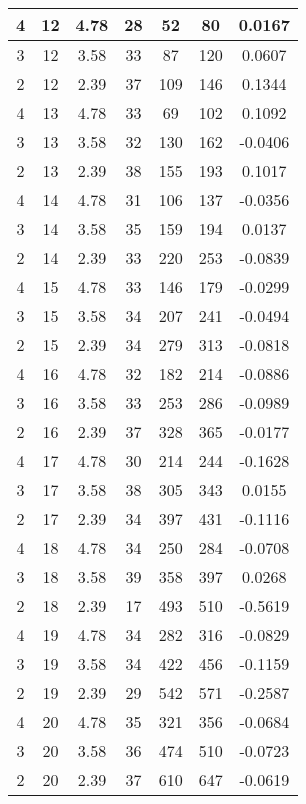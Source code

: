 \documentclass[letterpaper, 12pt]{article}
\begin{document}
\begin{longtable}{|c|c|c|c|c|c|c|}
\hline
4 & 12 & 4.78 & 28 & 52 & 80 & 0.0167 \\
\hline
3 & 12 & 3.58 & 33 & 87 & 120 & 0.0607 \\
\hline
2 & 12 & 2.39 & 37 & 109 & 146 & 0.1344 \\
\hline
4 & 13 & 4.78 & 33 & 69 & 102 & 0.1092 \\
\hline
3 & 13 & 3.58 & 32 & 130 & 162 & -0.0406 \\
\hline
2 & 13 & 2.39 & 38 & 155 & 193 & 0.1017 \\
\hline
4 & 14 & 4.78 & 31 & 106 & 137 & -0.0356 \\
\hline
3 & 14 & 3.58 & 35 & 159 & 194 & 0.0137 \\
\hline
2 & 14 & 2.39 & 33 & 220 & 253 & -0.0839 \\
\hline
4 & 15 & 4.78 & 33 & 146 & 179 & -0.0299 \\
\hline
3 & 15 & 3.58 & 34 & 207 & 241 & -0.0494 \\
\hline
2 & 15 & 2.39 & 34 & 279 & 313 & -0.0818 \\
\hline
4 & 16 & 4.78 & 32 & 182 & 214 & -0.0886 \\
\hline
3 & 16 & 3.58 & 33 & 253 & 286 & -0.0989 \\
\hline
2 & 16 & 2.39 & 37 & 328 & 365 & -0.0177 \\
\hline
4 & 17 & 4.78 & 30 & 214 & 244 & -0.1628 \\
\hline
3 & 17 & 3.58 & 38 & 305 & 343 & 0.0155 \\
\hline
2 & 17 & 2.39 & 34 & 397 & 431 & -0.1116 \\
\hline
4 & 18 & 4.78 & 34 & 250 & 284 & -0.0708 \\
\hline
3 & 18 & 3.58 & 39 & 358 & 397 & 0.0268 \\
\hline
2 & 18 & 2.39 & 17 & 493 & 510 & -0.5619 \\
\hline
4 & 19 & 4.78 & 34 & 282 & 316 & -0.0829 \\
\hline
3 & 19 & 3.58 & 34 & 422 & 456 & -0.1159 \\
\hline
2 & 19 & 2.39 & 29 & 542 & 571 & -0.2587 \\
\hline
4 & 20 & 4.78 & 35 & 321 & 356 & -0.0684 \\
\hline
3 & 20 & 3.58 & 36 & 474 & 510 & -0.0723 \\
\hline
2 & 20 & 2.39 & 37 & 610 & 647 & -0.0619 \\
\hline
\end{longtable}
\end{document}
